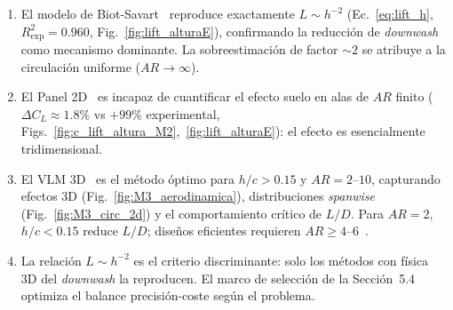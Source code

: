 \documentclass[twocolumn]{article}
\begin{document}
\begin{enumerate}
    \item El modelo de Biot-Savart~\cite{wieselsberger1922} reproduce exactamente $L \sim h^{-2}$ (Ec.~\eqref{eq:lift_h}, $R^2_{\exp} = 0.960$, Fig.~\ref{fig:lift_alturaE}), confirmando la reducción de \textit{downwash} como mecanismo dominante. La sobreestimación de factor $\sim 2$ se atribuye a la circulación uniforme ($AR \to \infty$).
    \item El Panel 2D~\cite{hess1967} es incapaz de cuantificar el efecto suelo en alas de $AR$ finito ($\Delta C_L \approx 1.8\%$ vs $+99\%$ experimental, Figs.~\ref{fig:c_lift_altura_M2},~\ref{fig:lift_alturaE}): el efecto es esencialmente tridimensional.
    \item El VLM 3D~\cite{katz2001} es el método óptimo para $h/c > 0.15$ y $AR = 2$--$10$, capturando efectos 3D (Fig.~\ref{fig:M3_aerodinamica}), distribuciones \textit{spanwise} (Fig.~\ref{fig:M3_circ_2d}) y el comportamiento crítico de $L/D$. Para $AR = 2$, $h/c < 0.15$ reduce $L/D$; diseños eficientes requieren $AR \geq 4$--$6$~\cite{rozhdestvensky2006}.
    \item La relación $L \sim h^{-2}$ es el criterio discriminante: solo los métodos con física 3D del \textit{downwash} la reproducen. El marco de selección de la Sección~5.4 optimiza el balance precisión-coste según el problema.
\end{enumerate}

\printbibliography
\end{document}
